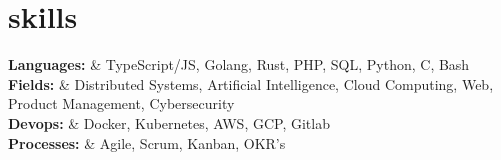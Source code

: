 \documentclass[]{cv-mauri}
\begin{document}
\section*{skills}
\begin{tabularcv}
	\textbf{Languages:} & TypeScript/JS, Golang, Rust, PHP, SQL, Python, C, Bash \\
	\textbf{Fields:} & Distributed Systems, Artificial Intelligence, Cloud Computing, Web, Product Management, Cybersecurity \\
	\textbf{Devops:} & Docker, Kubernetes, AWS, GCP, Gitlab \\
	\textbf{Processes:} & Agile, Scrum, Kanban, OKR's \\
\end{tabularcv}

\end{document}
